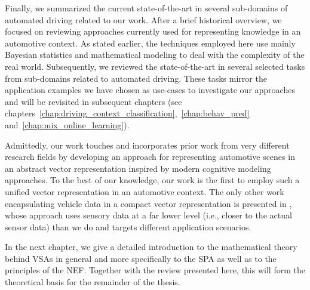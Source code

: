 Finally, we summarized the current state-of-the-art in several sub-domains of automated driving related to our work.
After a brief historical overview, we focused on reviewing approaches currently used for representing knowledge in an automotive context.
As stated earlier, the techniques employed here use mainly Bayesian statistics and mathematical modeling to deal with the complexity of the real world.
Subsequently, we reviewed the state-of-the-art in several selected tasks from sub-domains related to automated driving.
These tasks mirror the application examples we have chosen as use-cases to investigate our approaches and will be revisited in subsequent chapters (see chapters~\ref{chap:driving_context_classification},~\ref{chap:behav_pred} and~\ref{chap:mix_online_learning}).

Admittedly, our work touches and incorporates prior work from very different research fields by developing an approach for representing automotive scenes in an abstract vector representation inspired by modern cognitive modeling approaches.
To the best of our knowledge, our work is the first to employ such a unified vector representation in an automotive context.
The only other work encapsulating vehicle data in a compact vector representation is presented in \textcite{Hallac2018}, whose approach uses sensory data at a far lower level (i.e., closer to the actual sensor data) than we do and targets different application scenarios.

In the next chapter, we give a detailed introduction to the mathematical theory behind \acp{VSA} in general and more specifically to the \ac{SPA} as well as to the principles of the \ac{NEF}.
Together with the review presented here, this  will form the theoretical basis for the remainder of the thesis.
